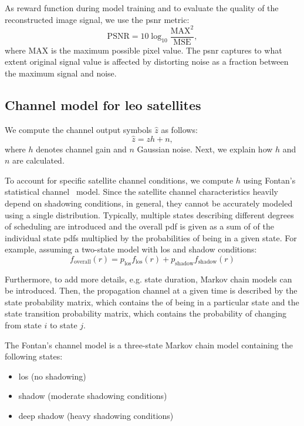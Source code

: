 \documentclass[conference]{IEEEtran}
\begin{document}
As reward function during model training and to evaluate the quality of the reconstructed image signal, we use the \ac{psnr} metric:
%
\begin{equation}
  \mathrm{PSNR} = 10 \log_{10}\frac{\mathrm{MAX}^2}{\mathrm{MSE}},
\end{equation}
%
where $\mathrm{MAX}$ is the maximum possible pixel value.
The \ac{psnr} captures to what extent original signal value is affected by distorting noise as a fraction between the maximum signal and noise.


\subsection{Channel model for \ac{leo} satellites}
\label{sub:channel_model}

We compute the channel output symbols $\hat{z}$ as follows:
\begin{equation}
  \hat{z} = zh + n,
\end{equation}
where $h$ denotes channel gain and $n$ Gaussian noise.
Next, we explain how $h$ and $n$ are calculated.

To account for specific satellite channel conditions, we compute $h$ using Fontan's statistical channel~\cite{} model. 
Since the satellite channel characteristics heavily depend on shadowing conditions, in general, 
they cannot be accurately modeled using a single distribution.
Typically, multiple states describing different degrees of scheduling are introduced 
and the overall pdf is given as a sum of of the individual state pdfs multiplied by the probabilities of being in a given state.
For example, assuming a two-state model with \ac{los} and shadow conditions: 
\begin{equation}
f_{\mathrm{overall}}(r) = p_{\mathrm{los}}f_{\mathrm{los}}(r) + p_{\mathrm{shadow}}f_{\mathrm{shadow}}(r)
\end{equation}

Furthermore, to add more details, e.g. state duration, Markov chain models can be introduced.
Then, the propagation channel at a given time is described by the state probability matrix, which contains the of being in a particular state
and the state transition probability matrix, which contains the probability of changing from state $i$ to state $j$.

The Fontan's channel model is a three-state Markov chain model containing the following states:
\begin{itemize}
  \item \ac{los} (no shadowing)
  \item shadow (moderate shadowing conditions)
  \item deep shadow (heavy shadowing conditions)
\end{itemize}
\end{document}
